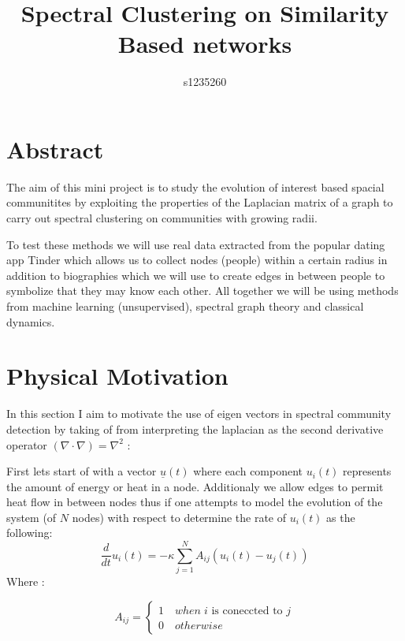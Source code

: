 \documentclass[10pt,twocolumn]{article}
\begin{document}
\title{Spectral Clustering on Similarity Based networks}
\author{s1235260}
\maketitle 




\section{Abstract}
The aim of this mini project is to study the evolution of interest based spacial communitites by exploiting the properties of the Laplacian matrix of a graph to carry out spectral clustering on communities with growing radii.
\newline

 To test these methods we will use real data extracted from the popular dating app Tinder which allows us to collect nodes (people) within a certain radius in addition to biographies which we will use to create edges in between people to symbolize that they may know each other.
\newline
All together we will be using methods from machine learning (unsupervised), spectral graph theory and classical dynamics.

\section{Physical Motivation}
In this section I aim to motivate the use of eigen vectors in spectral community detection by
taking of from interpreting the laplacian as the second derivative operator $(\nabla \cdot \nabla) = \nabla^{2}$ :

First lets start of with a vector $\underline{u}(t)$
where each component $u_{i}(t)$ represents the amount of energy or heat in a node. Additionaly we allow edges to permit heat flow in between nodes thus if one attempts to model the evolution of the system (of $N$ nodes) with respect to determine the rate of $u_{i}(t)$  as the following:
\[
\frac{d}{dt}u_{i}(t) = -\kappa \sum_{j=1}^{N}A_{ij}(u_{i}(t) -u_{j}(t))
\]
Where :

\[ A_{ij} = \begin{cases} 
   1 \quad when \; i \text{ is coneccted to } j \\
   0 \quad otherwise 
   \end{cases}
\]
\end{document}

